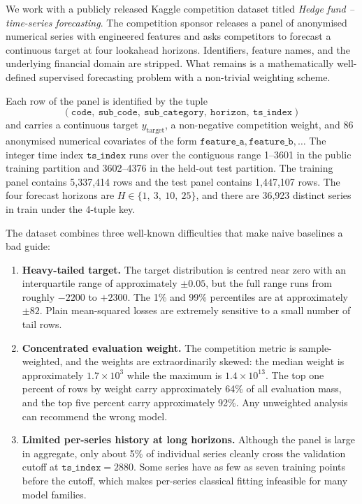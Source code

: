 We work with a publicly released Kaggle competition dataset titled \emph{Hedge fund -- time-series forecasting}. The competition sponsor releases a panel of anonymised numerical series with engineered features and asks competitors to forecast a continuous target at four lookahead horizons. Identifiers, feature names, and the underlying financial domain are stripped. What remains is a mathematically well-defined supervised forecasting problem with a non-trivial weighting scheme.

Each row of the panel is identified by the tuple
\[
(\mathtt{code},\ \mathtt{sub\_code},\ \mathtt{sub\_category},\ \mathtt{horizon},\ \mathtt{ts\_index})
\]
and carries a continuous target $y_{\text{target}}$, a non-negative competition weight, and 86 anonymised numerical covariates of the form $\mathtt{feature\_a}, \mathtt{feature\_b}, \ldots$ The integer time index $\mathtt{ts\_index}$ runs over the contiguous range 1--3601 in the public training partition and 3602--4376 in the held-out test partition. The training panel contains 5{,}337{,}414 rows and the test panel contains 1{,}447{,}107 rows. The four forecast horizons are $H \in \{1,\ 3,\ 10,\ 25\}$, and there are 36{,}923 distinct series in train under the 4-tuple key.

The dataset combines three well-known difficulties that make naive baselines a bad guide:

\begin{enumerate}
  \item \textbf{Heavy-tailed target.} The target distribution is centred near zero with an interquartile range of approximately $\pm 0.05$, but the full range runs from roughly $-2200$ to $+2300$. The 1\% and 99\% percentiles are at approximately $\pm 82$. Plain mean-squared losses are extremely sensitive to a small number of tail rows.
  \item \textbf{Concentrated evaluation weight.} The competition metric is sample-weighted, and the weights are extraordinarily skewed: the median weight is approximately $1.7 \times 10^{3}$ while the maximum is $1.4 \times 10^{13}$. The top one percent of rows by weight carry approximately 64\% of all evaluation mass, and the top five percent carry approximately 92\%. Any unweighted analysis can recommend the wrong model.
  \item \textbf{Limited per-series history at long horizons.} Although the panel is large in aggregate, only about 5\% of individual series cleanly cross the validation cutoff at $\mathtt{ts\_index} = 2880$. Some series have as few as seven training points before the cutoff, which makes per-series classical fitting infeasible for many model families.
\end{enumerate}


